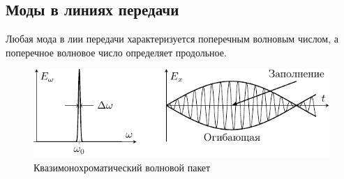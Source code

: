 \subsection{Моды в линиях передачи}
Любая мода в лии передачи характеризуется поперечным волновым числом, а поперечное волновое число определяет продольное.

\begin{figure}[H]
	\centering
	\includegraphics[scale=1.5]{img/lect3_ris8}
	\caption{Квазимонохроматический волновой пакет}
	\label{fig:lect3:8}
\end{figure}